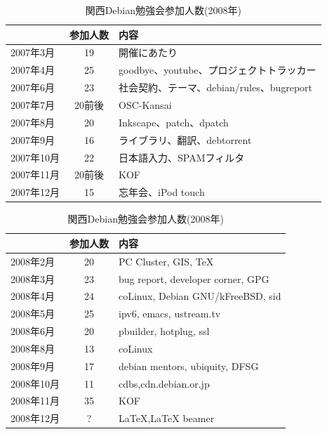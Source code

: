 \documentclass[mingoth,a4paper]{jsarticle}
\begin{document}
\begin{table}[!t]
\begin{minipage}{0.5\hsize}
 \caption{関西Debian勉強会参加人数(2007年)}\label{tab:count2007kansai}
 \begin{center}
  \begin{tabular}{|l|c|p{10em}|}
 \hline
 & 参加人数 & 内容 \\
 \hline
2007年3月 & 19 & 開催にあたり \\
2007年4月 & 25 & goodbye、youtube、プロジェクトトラッカー\\
2007年6月 & 23 & 社会契約、テーマ、debian/rules、bugreport\\
2007年7月 & 20前後 & OSC-Kansai \\
2007年8月 & 20 & Inkscape、patch、dpatch\\
2007年9月 & 16 & ライブラリ、翻訳、debtorrent\\
2007年10月 & 22& 日本語入力、SPAMフィルタ\\
2007年11月 & 20前後 & KOF \\   
2007年12月 & 15& 忘年会、iPod touch\\   
 \hline
  \end{tabular}
 \end{center}
\end{minipage}
\begin{minipage}{0.5\hsize}
 \caption{関西Debian勉強会参加人数(2008年)}\label{tab:count2008kansai}
 \begin{center}
  \begin{tabular}{|l|c|p{10em}|}
 \hline
 & 参加人数 & 内容 \\
 \hline
2008年2月 & 20 & PC Cluster, GIS, \TeX \\
2008年3月 & 23 & bug report, developer corner, GPG \\
2008年4月 & 24 & coLinux, Debian GNU/kFreeBSD, sid \\
2008年5月 & 25  & ipv6, emacs, ustream.tv\\
2008年6月 & 20  & pbuilder, hotplug, ssl\\
2008年8月 & 13  & coLinux \\
2008年9月 & 17  & debian mentors, ubiquity, DFSG\\
2008年10月 & 11  & cdbs,cdn.debian.or.jp \\
2008年11月 & 35  & KOF \\
2008年12月 & ?  & LaTeX,LaTeX beamer\\
 \hline
  \end{tabular}
 \end{center}
\end{minipage}
\end{table}
\end{document}
